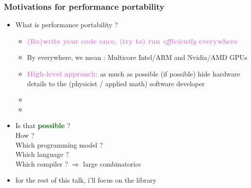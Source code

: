\begin{frame}
  \frametitle{Motivations for performance portability}

  \begin{itemize}
  \item {\Large What is performance portability ?}
    \begin{itemize}
    \item \textcolor{violet}{\large \bf (Re)write your code once, (try to) run {\it efficiently} everywhere}
    \item By everywhere, we mean : Multicore Intel/ARM and Nvidia/AMD GPUs
    \item \textcolor{violet}{\bf High-level approach:} as much as possible (if possible) hide hardware details to the (physicist / applied math) software developer
    \item {}
    \item {}
    \end{itemize}
  \item {\large Is that \textcolor{darkgreen}{\bf possible} ?}\\ How ?\\ Which programming model ?\\ Which language ?\\ Which compiler ? $\Rightarrow$ large combinatorics
  \item for the rest of this talk, i'll focus on the  library
  \end{itemize}

\end{frame}

